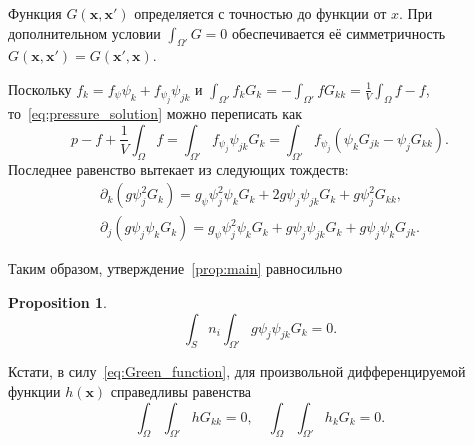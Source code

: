 \documentclass{article}
\newtheorem{proposition}{Proposition}
\newcommand{\bx}{\boldsymbol{x}}
\begin{document}
Функция \(G(\bx, \bx')\) определяется с точностью до функции от \(x\).
При дополнительном условии \(\int_{\Omega'} G = 0\)
обеспечивается её симметричность \(G(\bx, \bx') = G(\bx', \bx)\).

Поскольку \(f_k = f_\psi \psi_k + f_{\psi_j}\psi_{jk}\) и
\(\int_{\Omega'} f_k G_k = -\int_{\Omega'} f G_{kk} = \frac1V\int_\Omega f - f\),
то~\eqref{eq:pressure_solution} можно переписать как
\begin{equation}\label{eq:pressure_solution2}
    p - f + \frac1V\int_\Omega f = \int_{\Omega'} f_{\psi_j} \psi_{jk} G_k =
    \int_{\Omega'} f_{\psi_j} \left( \psi_k G_{jk} - \psi_j G_{kk} \right).
\end{equation}
Последнее равенство вытекает из следующих тождеств:
\begin{gather*}
    \partial_k\left( g\psi_j^2 G_k \right) = g_\psi \psi_j^2\psi_k G_k + 2g\psi_j\psi_{jk}G_k + g\psi_j^2 G_{kk}, \\
    \partial_j\left( g\psi_j\psi_k G_k\right) = g_\psi \psi_j^2\psi_k G_k + g\psi_j\psi_{jk}G_k + g\psi_j\psi_k G_{jk}.
\end{gather*}

Таким образом, утверждение~\ref{prop:main} равносильно
\begin{proposition}\label{prop:main2}
\begin{equation}\label{eq:forces_sum3}
    \int_S n_i \int_{\Omega'} g \psi_j \psi_{jk} G_k = 0.
\end{equation}
\end{proposition}

Кстати, в силу~\eqref{eq:Green_function}, для произвольной дифференцируемой функции \(h(\bx)\) справедливы равенства
\begin{equation}\label{eq:Green_double_integral}
    \int_\Omega \int_{\Omega'} h G_{kk} = 0, \quad
    \int_\Omega \int_{\Omega'} h_k G_k = 0.
\end{equation}
\end{document}
